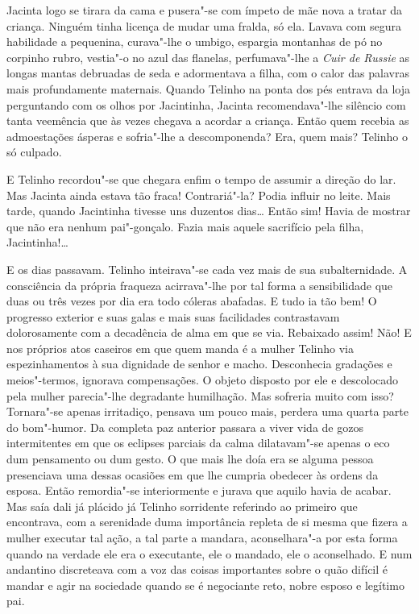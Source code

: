 \begin{linenumbers}
Jacinta logo se tirara da cama e pusera"-se com ímpeto de mãe nova a
tratar da criança. Ninguém tinha licença de mudar uma fralda, só ela.
Lavava com segura habilidade a pequenina, curava"-lhe o umbigo, espargia
montanhas de pó no corpinho rubro, vestia"-o no azul das flanelas,
perfumava"-lhe a \emph{Cuir de Russie} as longas mantas debruadas de seda
e adormentava a filha, com o calor das palavras mais profundamente
maternais. Quando Telinho na ponta dos pés entrava da loja perguntando
com os olhos por Jacintinha, Jacinta recomendava"-lhe silêncio com tanta
veemência que às vezes chegava a acordar a criança. Então quem recebia
as admoestações ásperas e sofria"-lhe a descomponenda? Era, quem mais?
Telinho o só culpado.

E Telinho recordou"-se que chegara enfim o tempo de assumir a direção do
lar. Mas Jacinta ainda estava tão fraca! Contrariá"-la? Podia influir no
leite. Mais tarde, quando Jacintinha tivesse uns duzentos dias\ldots{} Então
sim! Havia de mostrar que não era nenhum pai"-gonçalo. Fazia mais aquele
sacrifício pela filha, Jacintinha!\ldots{}

E os dias passavam. Telinho inteirava"-se cada vez mais de sua
subalternidade. A consciência da própria fraqueza acirrava"-lhe por tal
forma a sensibilidade que duas ou três vezes por dia era todo cóleras
abafadas. E tudo ia tão bem! O progresso exterior e suas galas e mais
suas facilidades contrastavam dolorosamente com a decadência de alma em
que se via. Rebaixado assim! Não! E nos próprios atos caseiros em que
quem manda é a mulher Telinho via espezinhamentos à sua dignidade de
senhor e macho. Desconhecia gradações e meios"-termos, ignorava
compensações. O objeto disposto por ele e descolocado pela mulher
parecia"-lhe degradante humilhação. Mas sofreria muito com isso?
Tornara"-se apenas irritadiço, pensava um pouco mais, perdera uma quarta
parte do bom"-humor. Da completa paz anterior passara a viver vida de
gozos intermitentes em que os eclipses parciais da calma dilatavam"-se
apenas o eco dum pensamento ou dum gesto. O que mais lhe doía era se
alguma pessoa presenciava uma dessas ocasiões em que lhe cumpria
obedecer às ordens da esposa. Então remordia"-se interiormente e jurava
que aquilo havia de acabar. Mas saía dali já plácido já Telinho
sorridente referindo ao primeiro que encontrava, com a serenidade duma
importância repleta de si mesma que fizera a mulher executar tal ação, a
tal parte a mandara, aconselhara"-a por esta forma quando na verdade ele
era o executante, ele o mandado, ele o aconselhado. E num andantino
discreteava com a voz das coisas importantes sobre o quão difícil é
mandar e agir na sociedade quando se é negociante reto, nobre esposo e
legítimo pai.


\end{linenumbers}
